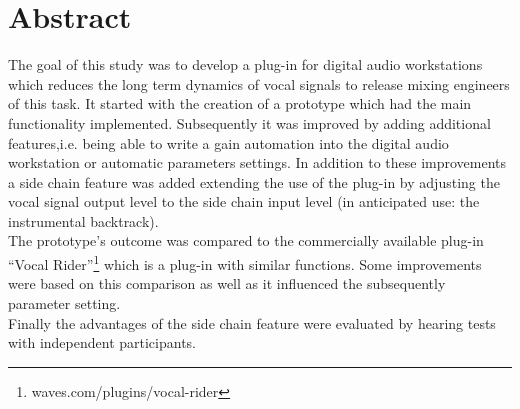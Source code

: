 \chapter*{Abstract}

The goal of this study was to develop a plug-in for digital audio workstations which reduces the long term dynamics of vocal signals to release mixing engineers of this task. It started with the creation of a prototype which had the main functionality implemented. Subsequently it was improved by adding additional features,i.e. being able to write a gain automation into the digital audio workstation or automatic parameters settings. In addition to these improvements a side chain feature was added extending the use of the plug-in by adjusting the vocal signal output level to the side chain input level (in anticipated use: the instrumental backtrack).\\
The prototype's outcome was compared to the commercially available plug-in “Vocal Rider”\footnote{waves.com/plugins/vocal-rider} which is a plug-in with similar functions. Some improvements were based on this comparison as well as it influenced the subsequently parameter setting.\\
Finally the advantages of the side chain feature were evaluated by hearing tests with independent participants.\\
